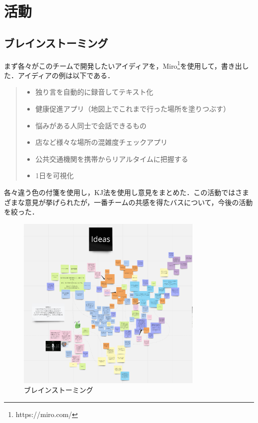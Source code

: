 \chapter{活動}
\section{ブレインストーミング}
まず各々がこのチームで開発したいアイディアを，Miro\footnote{https://miro.com/}を使用して，書き出した．アイディアの例は以下である．

\begin{quote}
    \begin{itemize}
        \item 独り言を自動的に録音してテキスト化
        \item 健康促進アプリ（地図上でこれまで行った場所を塗りつぶす）
        \item 悩みがある人同士で会話できるもの
        \item 店など様々な場所の混雑度チェックアプリ
        \item 公共交通機関を携帯からリアルタイムに把握する
        \item 1日を可視化
    \end{itemize}
\end{quote}

各々違う色の付箋を使用し，KJ法を使用し意見をまとめた．この活動ではさまざまな意見が挙げられたが，一番チームの共感を得たバスについて，今後の活動を絞った．

\begin{figure}[htbp]
    \centering
    \includegraphics[width=9cm]{images/brainstorm.png}
    \caption{ブレインストーミング}
    \label{fig:brainstorm}
\end{figure}


